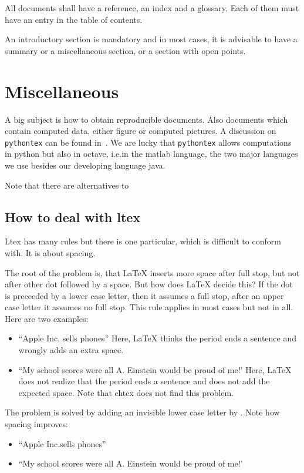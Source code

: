 \documentclass[a4paper,12pt]{article}
\begin{document}
All documents shall have a reference, an index and a glossary. 
Each of them must have an entry in the table of contents. 

An introductory section is mandatory and in most cases, 
it is advisable to have a summary or a miscellaneous section, 
or a section with open points. 


\section{Miscellaneous}\label{sec:misc}

A big subject is how to obtain reproducible documents. 
Also documents which contain computed data, either figure or computed pictures. 
A discussion on \texttt{pythontex} can be found in~\cite{Poo15}. 
We are lucky that \texttt{pythontex} allows computations in python but also in octave, 
i.e.\@ in the matlab language,  
the two major languages we use besides our developing language java. 

Note that there are alternatives to 


\subsection{How to deal with ltex}\label{subsec:ltex}

Ltex has many rules but there is one particular, which is difficult to conform with. 
It is about spacing. 

The root of the problem is, that \LaTeX{} inserts more space after full stop, 
but not after other dot followed by a space. 
But how does \LaTeX{} decide this? If the dot is preceeded by a lower case letter, 
then it assumes a full stop, after an upper case letter it assumes no full stop. 
This rule applies in most cases but not in all. 
Here are two examples: 
%
\begin{itemize}
  \item ``Apple Inc. sells phones''%
  Here, \LaTeX{} thinks the period ends a sentence and wrongly adds an extra space.
  \item ``My school scores were all A. Einstein would be proud of me!'
  Here, \LaTeX{} does not realize that the period ends a sentence and does not add the expected space. 
  Note that chtex does not find this problem. 
\end{itemize}

The problem is solved by adding an invisible lower case letter by \texttt{\textbackslash@}. 
Note how spacing improves: 
\begin{itemize}
  \item ``Apple Inc.\@ sells phones''
  \item ``My school scores were all A\@. Einstein would be proud of me!'
\end{itemize}
\end{document}
